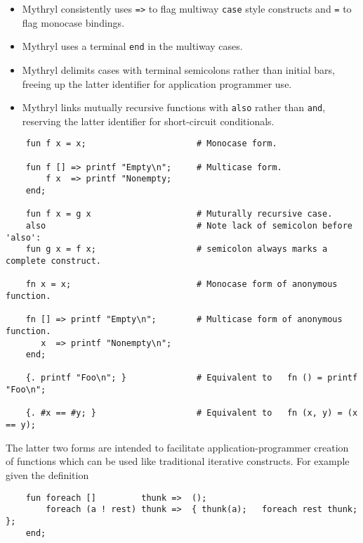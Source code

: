 \begin{itemize}

\item Mythryl consistently uses {\tt =>} to flag multiway {\tt case} 
style constructs and {\tt =} to flag monocase bindings.

\item Mythryl uses a terminal {\tt end} in the multiway cases.

\item Mythryl delimits cases with terminal semicolons rather than initial bars, 
freeing up the latter identifier for application programmer use.

\item Mythryl links mutually recursive functions with {\tt also} rather than 
{\tt and}, reserving the latter identifier for short-circuit conditionals.
\end{itemize}

\begin{verbatim}
    fun f x = x;                      # Monocase form.

    fun f [] => printf "Empty\n";     # Multicase form.
        f x  => printf "Nonempty;
    end;

    fun f x = g x                     # Muturally recursive case.
    also                              # Note lack of semicolon before 'also':
    fun g x = f x;                    # semicolon always marks a complete construct.

    fn x = x;                         # Monocase form of anonymous function.

    fn [] => printf "Empty\n";        # Multicase form of anonymous function.
       x  => printf "Nonempty\n";
    end;

    {. printf "Foo\n"; }              # Equivalent to   fn () = printf "Foo\n";

    {. #x == #y; }                    # Equivalent to   fn (x, y) = (x == y);
\end{verbatim}

The latter two forms are intended to facilitate application-programmer 
creation of functions which can be used like traditional iterative 
constructs.  For example given the definition

\begin{verbatim}
    fun foreach []         thunk =>  ();
        foreach (a ! rest) thunk =>  { thunk(a);   foreach rest thunk; };
    end;
\end{verbatim}

